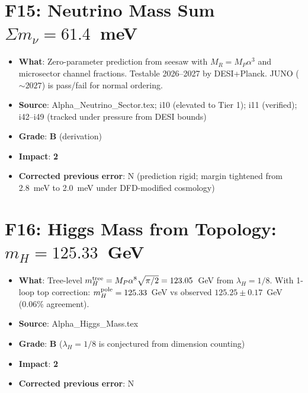 \documentclass[11pt,a4paper]{article}
\newcommand{\grade}[1]{\textbf{#1}}
\newcommand{\impact}[1]{\textbf{#1}}
\begin{document}
\section{F15: Neutrino Mass Sum $\Sigma m_\nu = 61.4$~meV}
\begin{itemize}[nosep]
\item \textbf{What}: Zero-parameter prediction from seesaw with $M_R = M_P \alpha^3$ and microsector channel fractions. Testable 2026--2027 by DESI+Planck. JUNO ($\sim 2027$) is pass/fail for normal ordering.
\item \textbf{Source}: Alpha\_Neutrino\_Sector.tex; i10 (elevated to Tier 1); i11 (verified); i42--i49 (tracked under pressure from DESI bounds)
\item \textbf{Grade}: \grade{B} (derivation)
\item \textbf{Impact}: \impact{2}
\item \textbf{Corrected previous error}: N (prediction rigid; margin tightened from 2.8~meV to 2.0~meV under DFD-modified cosmology)
\end{itemize}

\section{F16: Higgs Mass from Topology: $m_H = 125.33$~GeV}
\begin{itemize}[nosep]
\item \textbf{What}: Tree-level $m_H^{\rm tree} = M_P \alpha^8 \sqrt{\pi/2} = 123.05$~GeV from $\lambda_H = 1/8$. With 1-loop top correction: $m_H^{\rm pole} = 125.33$~GeV vs observed $125.25 \pm 0.17$~GeV (0.06\% agreement).
\item \textbf{Source}: Alpha\_Higgs\_Mass.tex
\item \textbf{Grade}: \grade{B} ($\lambda_H = 1/8$ is conjectured from dimension counting)
\item \textbf{Impact}: \impact{2}
\item \textbf{Corrected previous error}: N
\end{itemize}

\end{document}
